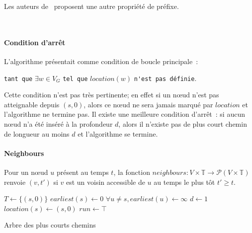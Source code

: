\documentclass[12pt,a4paper]{article}
\begin{document}
Les auteurs de~\cite{DBLP:journals/ijfcs/XuanFJ03} proposent une autre
propriété de préfixe.

\noindent
{}\\

\paragraph{Condition d'arrêt}
L'algorithme présentait comme condition de boucle principale~:
\begin{center}
  \verb|tant que| \(\exists w \in V_G\) \verb|tel que| \(location(w)\)
  \verb|n'est pas définie|.
\end{center}
Cette condition n'est pas très pertinente; en effet si un nœud n'est
pas atteignable depuis \((s, 0)\), alors ce nœud ne sera jamais marqué
par \(location\) et l'algorithme ne termine pas. Il existe une
meilleure condition d'arrêt~: si aucun nœud n'a été inséré à la
profondeur \(d\), alors il n'existe pas de plus court chemin de
longueur au moins \(d\) et l'algorithme se termine.

\paragraph{Neighbours}
Pour un nœud \(u\) présent au temps \(t\), la fonction
\(neighbours : V \times \mathbb{T} \to \mathcal{P}(V \times
\mathbb{T})\) renvoie \((v, t')\) si \(v\) est un voisin accessible de
\(u\) au temps le plus tôt \(t' \geq t\).\\

\begin{algorithm}[H]
  \DontPrintSemicolon{}
  \(T \leftarrow \{(s, 0)\}\)\;
  \(earliest(s) \leftarrow 0\)\;
  \(\forall u \neq s, earliest(u) \leftarrow \infty\)\;
  \(d \leftarrow 1\)\;
  \(location(s) \leftarrow (s, 0)\)\;
  \(run \leftarrow \top\)\;
  \caption{Arbre des plus courts chemins\label{alg:shortest_path}}
\end{algorithm}
\end{document}
